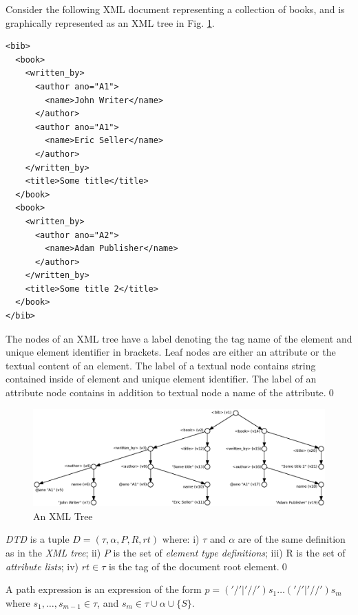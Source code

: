 \begin{example}\label{example1ref}
Consider the following XML document representing a collection of books, and is graphically represented as an XML tree in Fig. \ref{example1}.
\begin{verbatim}
<bib>
  <book>
    <written_by>
      <author ano="A1">
        <name>John Writer</name>
      </author>
      <author ano="A1">
        <name>Eric Seller</name>
      </author>
    </written_by>
    <title>Some title</title>
  </book>
  <book>
    <written_by>
      <author ano="A2">
        <name>Adam Publisher</name>
      </author>
    </written_by>
    <title>Some title 2</title>
  </book>
</bib>
\end{verbatim}

The nodes of an XML tree have a label denoting the tag name of the element and unique element identifier in brackets. Leaf nodes are either an attribute or the textual content of an element. The label of a textual node contains string contained inside of element and unique element identifier. The label of an attribute node contains in addition to textual node a name of the attribute.\qed
\end{example}

\begin{figure}[h]
    \centering\includegraphics[width=\textwidth]{example1-new}
	\caption{An XML Tree} \label{example1}
\end{figure}

\begin{define}[DTD]\label{dtdDef}
{\sl DTD} is a tuple $D = (\tau, \alpha, P, R, rt)$ where: i) $\tau$ and $\alpha$ are of the same definition as in the \emph{XML tree}; ii) $P$ is the set of \emph{element type definitions}; iii) R is the set of \emph{attribute lists}; iv) $rt \in \tau$ is the tag of the document root element.\qed
\end{define}

\begin{define}
A path expression is an expression of the form $p = ('/' | '//')s_1 \dots ('/'|'//')s_m$ where $s_1, \dots, s_{m-1} \in \tau$, and $s_m \in \tau \cup \alpha \cup \{S\}$.
\end{define}

